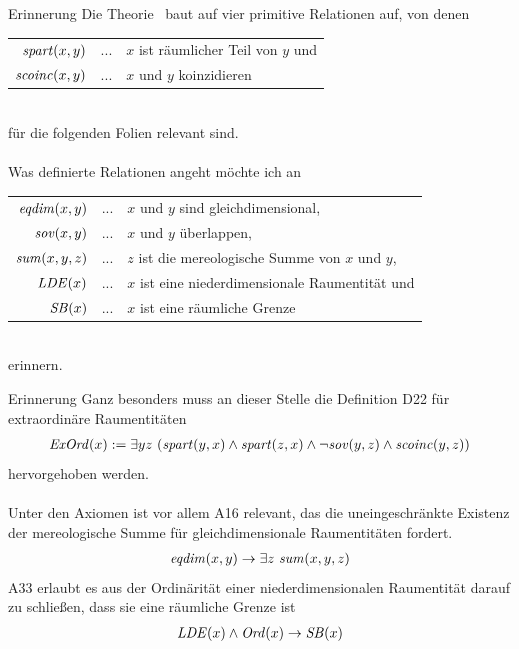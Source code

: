 \documentclass[10pt,xcolor={dvipsnames}]{beamer}
\begin{document}
\begin{frame}{\bs}{Erinnerung}
    Die Theorie \bs\ baut auf vier primitive Relationen auf, von denen\\
    \vspace{4pt}
    \begin{tabular}{ r c l }
        $\mathit{spart}(x,y)$ & ... & $x$ ist räumlicher Teil von $y$ und\\
        $\mathit{scoinc}(x,y)$ & ... & $x$ und $y$ koinzidieren
    \end{tabular}\\
    \vspace{4pt}
    für die folgenden Folien relevant sind.
    \\ \ \\
    Was definierte Relationen angeht möchte ich an\\
    \vspace{4pt}
    \begin{tabular}{ r c l }
        $\mathit{eqdim}(x,y)$ & ... & $x$ und $y$ sind gleichdimensional,\\
        $\mathit{sov}(x,y)$ & ... & $x$ und $y$ überlappen,\\
        $\mathit{sum}(x,y,z)$ & ... & $z$ ist die mereologische Summe von $x$ und $y$,\\
        $\mathit{LDE}(x)$ & ... & $x$ ist eine niederdimensionale Raumentität und\\
        $\mathit{SB}(x)$ & ... & $x$ ist eine räumliche Grenze
    \end{tabular}\\
    \vspace{4pt}
    erinnern.
\end{frame}


\begin{frame}{\bs}{Erinnerung}
    Ganz besonders muss an dieser Stelle die Definition D22 für extraordinäre Raumentitäten
    \begin{align*}
        \mathit{ExOrd}(x) := \exists yz\ (\mathit{spart}(y,x) \wedge \mathit{spart}(z,x) \wedge \neg\mathit{sov}(y,z) \wedge \mathit{scoinc}(y,z))
    \end{align*}
    hervorgehoben werden.
    \\ \ \\
    Unter den Axiomen ist vor allem A16 relevant, das die uneingeschränkte Existenz der mereologische Summe für gleichdimensionale Raumentitäten fordert.
    \begin{align*}
        \mathit{eqdim}(x,y) \to \exists z\ \mathit{sum}(x,y,z)
    \end{align*}
    A33 erlaubt es aus der Ordinärität einer niederdimensionalen Raumentität darauf zu schließen, dass sie eine räumliche Grenze ist
    \begin{align*}
        \mathit{LDE}(x) \wedge \mathit{Ord}(x) \to \mathit{SB}(x)
    \end{align*}
\end{frame}
\end{document}
